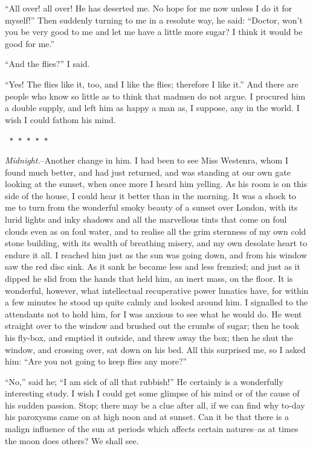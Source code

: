 \documentclass[12pt,openright]{book}
\begin{document}
“All over! all over! He has deserted me. No hope for me now unless I do it for myself!” Then suddenly turning to me in a resolute way, he said: “Doctor, won’t you be very good to me and let me have a little more sugar? I think it would be good for me.”

“And the flies?” I said.

“Yes! The flies like it, too, and I like the flies; therefore I like it.” And there are people who know so little as to think that madmen do not argue. I procured him a double supply, and left him as happy a man as, I suppose, any in the world. I wish I could fathom his mind.

\texttt{   *       *       *       *       *}

\textit{Midnight.}–Another change in him. I had been to see Miss Westenra, whom I found much better, and had just returned, and was standing at our own gate looking at the sunset, when once more I heard him yelling. As his room is on this side of the house, I could hear it better than in the morning. It was a shock to me to turn from the wonderful smoky beauty of a sunset over London, with its lurid lights and inky shadows and all the marvellous tints that come on foul clouds even as on foul water, and to realise all the grim sternness of my own cold stone building, with its wealth of breathing misery, and my own desolate heart to endure it all. I reached him just as the sun was going down, and from his window saw the red disc sink. As it sank he became less and less frenzied; and just as it dipped he slid from the hands that held him, an inert mass, on the floor. It is wonderful, however, what intellectual recuperative power lunatics have, for within a few minutes he stood up quite calmly and looked around him. I signalled to the attendants not to hold him, for I was anxious to see what he would do. He went straight over to the window and brushed out the crumbs of sugar; then he took his fly-box, and emptied it outside, and threw away the box; then he shut the window, and crossing over, sat down on his bed. All this surprised me, so I asked him: “Are you not going to keep flies any more?”

“No,” said he; “I am sick of all that rubbish!” He certainly is a wonderfully interesting study. I wish I could get some glimpse of his mind or of the cause of his sudden passion. Stop; there may be a clue after all, if we can find why to-day his paroxysms came on at high noon and at sunset. Can it be that there is a malign influence of the sun at periods which affects certain natures–as at times the moon does others? We shall see.
\end{document}
